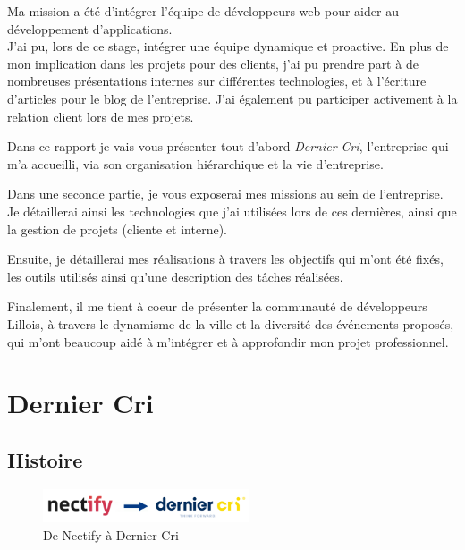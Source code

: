 \documentclass[12pt,a4paper]{article}
\begin{document}
  \bigskip

  Ma mission a été d'intégrer l'équipe de développeurs web pour aider au
  développement d'applications.\\
  J'ai pu, lors de ce stage, intégrer une équipe dynamique et proactive.
  En plus de mon implication dans les projets pour des clients, j'ai pu
  prendre part à de nombreuses présentations internes sur différentes
  technologies, et à l'écriture d'articles pour le blog de l'entreprise.
  J'ai également pu participer activement à la relation client lors de mes
  projets.

  \bigskip

  Dans ce rapport je vais vous présenter tout d'abord \emph{Dernier Cri},
  l'entreprise qui m'a accueilli, via son organisation hiérarchique et la
  vie d'entreprise.

  \bigskip

  Dans une seconde partie, je vous exposerai mes missions au sein de
  l'entreprise. Je détaillerai ainsi les technologies que j'ai utilisées
  lors de ces dernières, ainsi que la gestion de projets (cliente et
  interne).

  \bigskip

  Ensuite, je détaillerai mes réalisations à travers les objectifs qui
  m'ont été fixés, les outils utilisés ainsi qu'une description des tâches
  réalisées.

  \bigskip

  Finalement, il me tient à coeur de présenter la communauté de
  développeurs Lillois, à travers le dynamisme de la ville et la diversité
  des événements proposés, qui m'ont beaucoup aidé à m'intégrer et à
  approfondir mon projet professionnel.

  \newpage

  \section{Dernier Cri}\label{dernier-cri}

  \bigskip

  \subsection{Histoire}\label{histoire}

  \begin{figure}[h]
    \centering
    \includegraphics[height=1cm]{figures/NectifyToDC.png}
    \caption{De Nectify à Dernier Cri}
  \end{figure}
\end{document}
